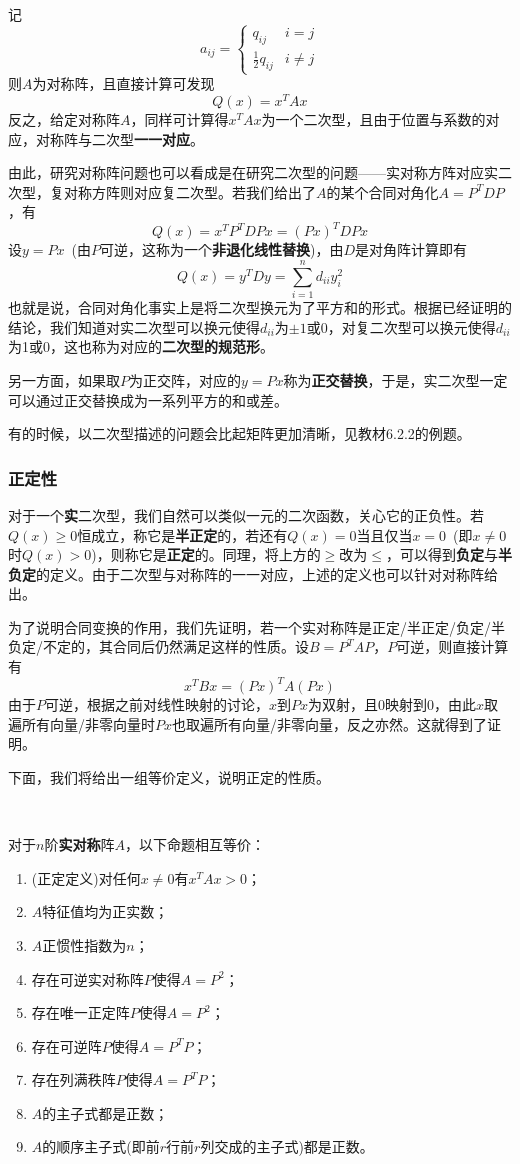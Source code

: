 \documentclass[a4paper,UTF8,fontset=windows]{ctexart}
\newcommand*{\note}{\noindent *}
\begin{document}
记
$$a_{ij}=\begin{cases}q_{ij}&i=j\\\frac{1}{2}q_{ij}&i\ne j\end{cases}$$
则$A$为对称阵，且直接计算可发现
$$Q(x)=x^TAx$$
反之，给定对称阵$A$，同样可计算得$x^TAx$为一个二次型，且由于位置与系数的对应，对称阵与二次型\textbf{一一对应}。

由此，研究对称阵问题也可以看成是在研究二次型的问题——实对称方阵对应实二次型，复对称方阵则对应复二次型。若我们给出了$A$的某个合同对角化$A=P^TDP$，有
$$Q(x)=x^TP^TDPx=(Px)^TDPx$$
设$y=Px$\ (由$P$可逆，这称为一个\textbf{非退化线性替换})，由$D$是对角阵计算即有
$$Q(x)=y^TDy=\sum_{i=1}^nd_{ii}y_i^2$$
也就是说，合同对角化事实上是将二次型换元为了平方和的形式。根据已经证明的结论，我们知道对实二次型可以换元使得$d_{ii}$为$\pm1$或0，对复二次型可以换元使得$d_{ii}$为1或0，这也称为对应的\textbf{二次型的规范形}。

另一方面，如果取$P$为正交阵，对应的$y=Px$称为\textbf{正交替换}，于是，实二次型一定可以通过正交替换成为一系列平方的和或差。

\note 有的时候，以二次型描述的问题会比起矩阵更加清晰，见教材6.2.2的例题。

\subsubsection{正定性}
对于一个\textbf{实}二次型，我们自然可以类似一元的二次函数，关心它的正负性。若$Q(x)\ge0$恒成立，称它是\textbf{半正定}的，若还有$Q(x)=0$当且仅当$x=0$\ (即$x\ne0$时$Q(x)>0$)，则称它是\textbf{正定}的。同理，将上方的$\ge$改为$\le$，可以得到\textbf{负定}与\textbf{半负定}的定义。由于二次型与对称阵的一一对应，上述的定义也可以针对对称阵给出。

为了说明合同变换的作用，我们先证明，若一个实对称阵是正定/半正定/负定/半负定/不定的，其合同后仍然满足这样的性质。设$B=P^TAP$，$P$可逆，则直接计算有
$$x^TBx=(Px)^TA(Px)$$
由于$P$可逆，根据之前对线性映射的讨论，$x$到$Px$为双射，且0映射到0，由此$x$取遍所有向量/非零向量时$Px$也取遍所有向量/非零向量，反之亦然。这就得到了证明。

下面，我们将给出一组等价定义，说明正定的性质。

\

对于$n$阶\textbf{实对称}阵$A$，以下命题相互等价：
\begin{enumerate}
    \item (正定定义)对任何$x\ne0$有$x^TAx>0$；
    \item $A$特征值均为正实数；
    \item $A$正惯性指数为$n$；
    \item 存在可逆实对称阵$P$使得$A=P^2$；
    \item 存在唯一正定阵$P$使得$A=P^2$；
    \item 存在可逆阵$P$使得$A=P^TP$；
    \item 存在列满秩阵$P$使得$A=P^TP$；
    \item $A$的主子式都是正数；
    \item $A$的顺序主子式(即前$r$行前$r$列交成的主子式)都是正数。
\end{enumerate}
\end{document}
